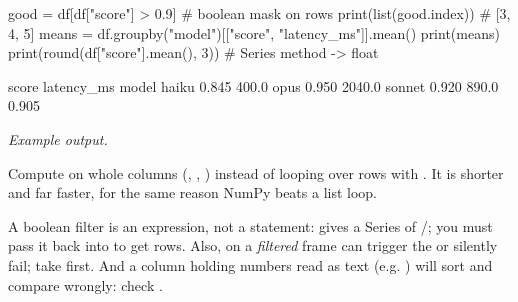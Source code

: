 \begin{pycode}
good = df[df["score"] > 0.9]                    # boolean mask on rows
print(list(good.index))                         # [3, 4, 5]
means = df.groupby("model")[["score", "latency_ms"]].mean()
print(means)
print(round(df["score"].mean(), 3))             # Series method -> float
\end{pycode}
\begin{rawcode}
[3, 4, 5]
        score  latency_ms
model
haiku   0.845       400.0
opus    0.950      2040.0
sonnet  0.920       890.0
0.905
\end{rawcode}
\noindent\textit{Example output.}

\begin{center}
\end{center}

\begin{gamerule}
Compute on whole columns (, , ) instead of looping
over rows with . It is shorter and far faster, for the same reason NumPy beats a list loop.
\end{gamerule}

\begin{trap}
A boolean filter is an expression, not a statement:  gives a Series of
/; you must pass it back into  to get rows. Also,
 on a \emph{filtered} frame can trigger the  or
silently fail; take  first. And a column holding numbers read as text (e.g.
) will sort and compare wrongly: check .
\end{trap}

